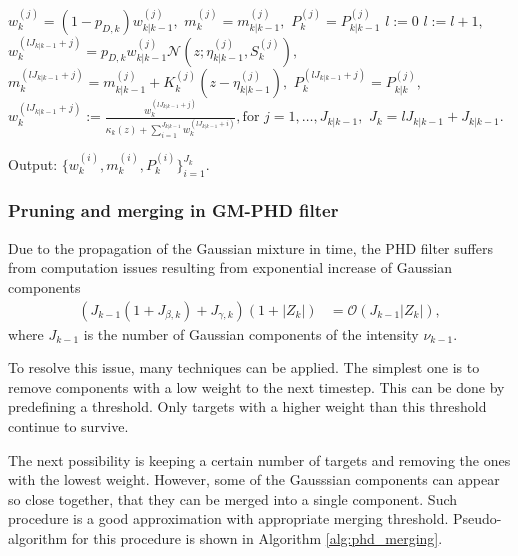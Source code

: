 \begin{algorithm}[h]
\begin{algorithmic}[1]
        \State
         
            \State $w_k^{(j)} = (1 - p_{D,k}) w_{k|k-1}^{(j)},$ \quad
             $m_k^{(j)} = m_{k|k-1}^{(j)},$ \quad
             $P_k^{(j)} = P_{k|k-1}^{(j)}$
        \EndFor
        \State $l:=0$
         
            \State $l:=l+1,$
                \State $w_k^{(l J_{k|k-1} + j)} = p_{D,k} w_{k|k-1}^{(j)} \mathcal{N}(z; \eta_{k|k-1}^{(j)},S_k^{(j)}),$
                \State $m_k^{(l J_{k|k-1} + j)} = m_{k|k-1}^{(j)} + K_k^{(j)} (z - \eta_{k|k-1}^{(j)}),$
                \State $P_k^{(l J_{k|k-1} + j)} = P_{k|k}^{(j)},$
            \EndFor
        \State $w_k^{(l J_{k|k-1} + j)} := \frac{w_k^{(l J_{k|k-1} + j)}}{\kappa_k(z) + \sum_{i=1}^{J_{k|k-1}} w_k^{(
            l J_{k|k-1} + i)}}, \text{for $j = 1,\dots,J_{k|k-1}$},$
        \EndFor
        \State $J_k = l J_{k|k-1} + J_{k|k-1}.$
        \EndProcedure

        \State Output: $\{ w_k^{(i)}, m_k^{(i)}, P_k^{(i)} \}_{i=1}^{J_k}$.
    \end{algorithmic}
    \label{alg:phd}
\end{algorithm}

        \subsubsection{Pruning and merging in GM-PHD filter}
\label{sec:phd_pruning_and_merging}
Due to the propagation of the Gaussian mixture in time, the PHD filter suffers from computation issues resulting from
exponential increase of Gaussian components
\begin{align}
(J_{k-1} (1 + J_{\beta,k}) + J_{\gamma,k}) (1 + |Z_k|) &= \mathcal{O}(J_{k-1} |Z_k|),
\end{align}
where $J_{k-1}$ is the number of Gaussian components of the intensity $\nu_{k-1}$.

To resolve this issue, many techniques can be applied. The simplest one is to remove components with a low weight to the next timestep. This can be done by predefining \linebreak a threshold. Only targets with a higher weight than this threshold continue to survive.

The next possibility is keeping a certain number of targets and removing the ones with the lowest weight. However,
some of the Gausssian components can appear so close together, that they can be merged into a single component. Such
procedure is a good approximation with appropriate merging threshold. Pseudo-algorithm for this procedure is shown in Algorithm \ref{alg:phd_merging}.

